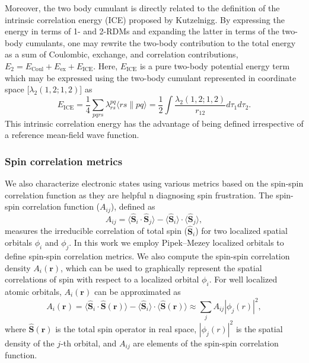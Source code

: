 \documentclass[aip,jcp,amsmath,amssymb, preprint]{revtex4-1}
\begin{document}
Moreover, the two body cumulant is directly related to the definition of the intrinsic correlation energy (ICE) proposed by Kutzelnigg.\cite{kutzelnigg2003theory}
By expressing the energy in terms of 1- and 2-RDMs and expanding the latter in terms of the two-body cumulants, one may rewrite the two-body contribution to the total energy as a sum of Coulombic, exchange, and correlation contributions, $E_{2} = E_{\text{Coul}} + E_{\text{ex}} + E_{\text{ICE}}$.
Here, $E_{\text{ICE}}$ is a pure two-body potential energy term which may be expressed using the two-body cumulant represented in coordinate space [$\lambda_{2}(1,2;1,2)$] as
\begin{equation}
E_{\text{ICE}} =\frac{1}{4} \sum_{pqrs} \lambda^{pq}_{rs} \langle{rs \| pq} \rangle = \frac{1}{2}\int \frac{\lambda_{2}(1,2;1,2)}{r_{12}} d\tau_{1}d\tau_{2} 
.
\end{equation}
This intrinsic correlation energy has the advantage of being defined irrespective of a reference mean-field wave function.

\subsubsection{Spin correlation metrics}

We also characterize electronic states using various metrics based on the spin-spin correlation function as they are helpful n diagnosing spin frustration.
The spin-spin correlation function ($A_{ij}$), defined as 
\begin{equation}
A_{ij} = \langle \mathbf{\hat{S}}_{i} \cdot \mathbf{\hat{S}}_{j} \rangle - \langle \mathbf{\hat{S}}_{i} \rangle \cdot \langle \mathbf{\hat{S}}_{j} \rangle,
\end{equation}
measures the irreducible correlation of total spin ($ \mathbf{\hat{S}}_{i}$) for two localized spatial orbitals $\phi_i$ and $\phi_j$.
In this work we employ Pipek--Mezey localized orbitals\cite{Pipek1989FastIntrinsic} to define spin-spin correlation metrics.
We also compute the spin-spin correlation density $A_{i}(\mathbf{r})$, which can be used to graphically represent the spatial correlations of spin with respect to a localized orbital $\phi_i$.
For well localized atomic orbitals, $A_{i}(\mathbf{r})$ can be approximated as
\begin{equation}
A_{i}(\mathbf{r}) = \langle \mathbf{\hat{S}}_{i} \cdot \mathbf{\hat{S}}(\mathbf{r})\rangle -   \langle \mathbf{\hat{S}}_{i} \rangle \cdot \langle \mathbf{\hat{S}}(\mathbf{r}) \rangle\approx \sum_{j} A_{ij} |\phi_{j}(r)|^{2},
\end{equation}
where $\mathbf{\hat{S}}(\mathbf{r})$ is the total spin operator in real space, $|\phi_{j}(r)|^{2}$ is the spatial density of the $j$-th orbital, and $A_{ij}$ are elements of the spin-spin correlation function.
\end{document}
